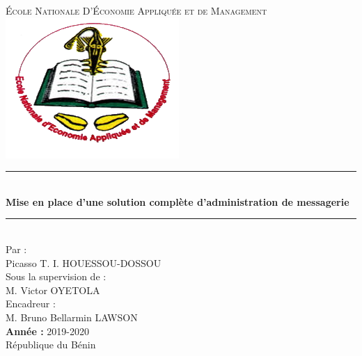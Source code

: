 \documentclass[a4paper,12pt,french]{report} %
\begin{document}
\begin{titlepage}
\newcommand{\HRule}{\rule{\linewidth}{0.5mm}}
\center
\textsc{\LARGE
\'Ecole Nationale D'\'Economie Appliquée et de Management
} \\[1cm]
\includegraphics[scale=1]{figure/eneam-logo.png} \\[1cm]
\HRule \\[0.4cm]
{ \huge \bfseries Mise en place d'une solution complète d'administration de messagerie \\[0.15cm] }
\HRule \\[1.5cm]
Par : \\[0.1cm]
Picasso T. I. HOUESSOU-DOSSOU \\[1cm]
Sous la supervision de :\\[0.1cm]
 M. Victor OYETOLA \\ [1.5cm]
 Encadreur : \\[0.1cm]
 M. Bruno Bellarmin LAWSON \\[1cm]
\textbf{Année :} 2019-2020 \\ [3cm]
République du Bénin
\end{titlepage}
\end{document}

